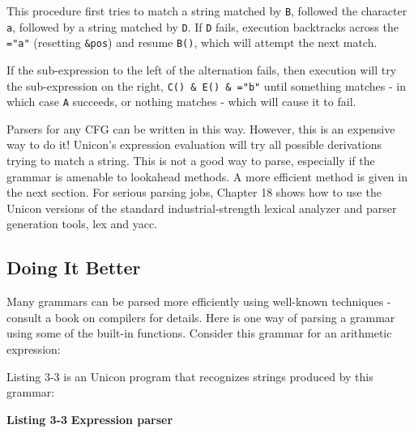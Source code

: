 \noindent
This procedure first tries to match a string matched by \texttt{B},
followed the character \texttt{a}, followed by a string matched by
\texttt{D}. If \texttt{D} fails, execution
backtracks across the \texttt{="a"}
(resetting \texttt{\&pos}) and resume \texttt{B()}, which will attempt
the next match.

If the sub-expression to the left of the alternation fails, then execution will try the
sub-expression on the right, \texttt{C() \& E() \&
="b"} until something matches - in which
case \texttt{A} succeeds, or nothing matches - which will cause it to
fail.

Parsers for any CFG can be written in this way. However, this is an
expensive way to do it! Unicon's
expression evaluation will try all possible derivations
trying to match a string. This is not a good way to parse, especially
if the grammar is amenable to lookahead methods. A more efficient
method is given in the next section. For serious parsing jobs, Chapter
18 shows how to use the Unicon versions of the standard
industrial-strength lexical analyzer and parser generation tools, lex
and yacc.

\subsection{Doing It Better}

Many grammars can be parsed more efficiently using
well-known techniques - consult a book on compilers for details. Here
is one way of parsing a grammar using some of the built-in
functions. Consider this grammar for an arithmetic expression:


\noindent
Listing 3-3 is an Unicon program that recognizes strings produced by
this grammar:

\bigskip

{\sffamily\bfseries Listing 3-3}
{\sffamily\bfseries Expression parser}

